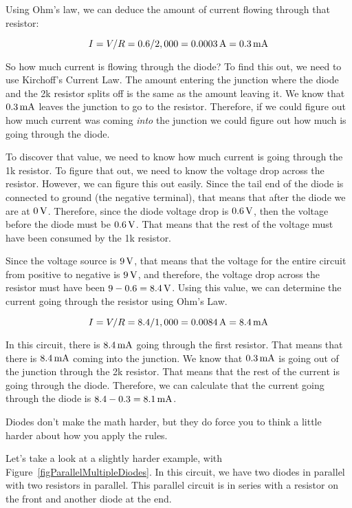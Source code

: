 Using Ohm's law, we can deduce the amount of current flowing through that resistor:

$$ I = V / R = 0.6 / 2,000 = 0.0003\,\si{\ampere} = 0.3\,\si{\milli\ampere} $$

So how much current is flowing through the diode?
To find this out, we need to use Kirchoff's Current Law.
The amount entering the junction where the diode and the 2k resistor splits off is the same as the amount leaving it.
We know that $0.3\,\si{\milli\ampere}$ leaves the junction to go to the resistor.
Therefore, if we could figure out how much current was coming \emph{into} the junction we could figure out how much is going through the diode.

To discover that value, we need to know how much current is going through the 1k resistor.
To figure that out, we need to know the voltage drop across the resistor.
However, we can figure this out easily.  
Since the tail end of the diode is connected to ground (the negative terminal), that means that after the diode we are at $0\,\si{\volt}$.  
Therefore, since the diode voltage drop is $0.6\,\si{\volt}$, then the voltage before the diode must be $0.6\,\si{\volt}$.
That means that the rest of the voltage must have been consumed by the 1k resistor.

Since the voltage source is $9\,\si{\volt}$, that means that the voltage for the entire circuit from positive to negative is $9\,\si{\volt}$, and therefore, the voltage drop across the resistor must have been $9 - 0.6 = 8.4\,\si{\volt}$.
Using this value, we can determine the current going through the resistor using Ohm's Law.

$$ I = V / R = 8.4 / 1,000 = 0.0084\,\si{\ampere} = 8.4\,\si{\milli\ampere} $$

In this circuit, there is $8.4\,\si{\milli\ampere}$ going through the first resistor.
That means that there is $8.4\,\si{\milli\ampere}$ coming into the junction.
We know that $0.3\,\si{\milli\ampere}$ is going out of the junction through the 2k resistor.
That means that the rest of the current is going through the diode.
Therefore, we can calculate that the current going through the diode is $8.4 - 0.3 = 8.1\,\si{\milli\ampere}$.

Diodes don't make the math harder, but they do force you to think a little harder about how you apply the rules.

Let's take a look at a slightly harder example, with Figure~\ref{figParallelMultipleDiodes}.
In this circuit, we have two diodes in parallel with two resistors in parallel.
This parallel circuit is in series with a resistor on the front and another diode at the end. 

